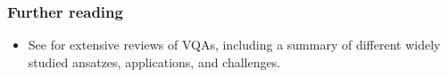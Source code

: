 \begin{refsection}

\subsubsection*{Further reading}

\begin{itemize}
    \item See \cite{cerezo2020variationalreview, bharti2022nisq} for extensive reviews of VQAs, including a summary of different widely studied ansatzes, applications, and challenges.
\end{itemize}
\printbibliography[heading=secbib,segment=\therefsegment]
\end{refsection}